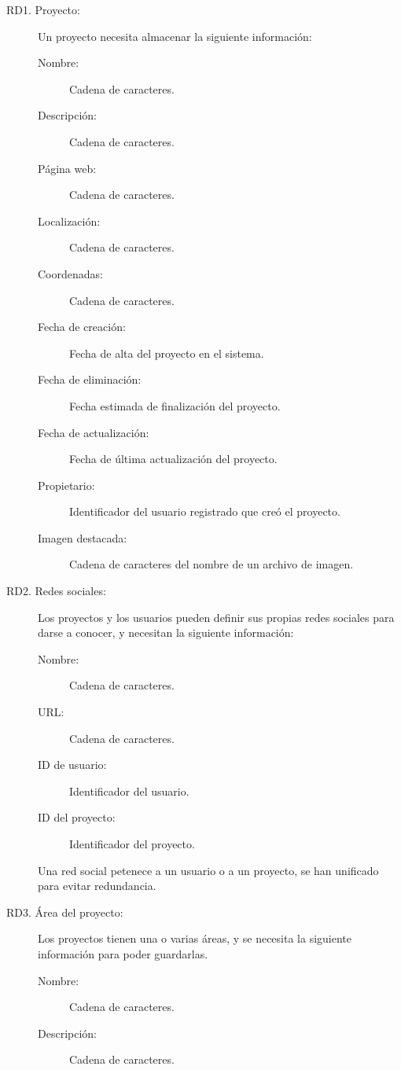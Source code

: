 \begin{description}
    \item[RD1. Proyecto:] Un proyecto necesita almacenar la siguiente información:
        \begin{description}
            \item[Nombre:] Cadena de caracteres.
            \item[Descripción:] Cadena de caracteres.
            \item[Página web:] Cadena de caracteres.
            \item[Localización:] Cadena de caracteres.
            \item[Coordenadas:] Cadena de caracteres.
            \item[Fecha de creación:] Fecha de alta del proyecto en el sistema.
            \item[Fecha de eliminación:] Fecha estimada de finalización del proyecto.
            \item[Fecha de actualización:] Fecha de última actualización del proyecto.
            \item[Propietario:] Identificador del usuario registrado que creó el proyecto.
            \item[Imagen destacada:] Cadena de caracteres del nombre de un archivo de imagen.
        \end{description}
    \item[RD2. Redes sociales:] Los proyectos y los usuarios pueden definir sus propias redes sociales para darse a conocer, y necesitan la siguiente información:
        \begin{description}
            \item[Nombre:] Cadena de caracteres.
            \item[URL:] Cadena de caracteres.
            \item[ID de usuario:] Identificador del usuario.
            \item[ID del proyecto:] Identificador del proyecto.
        \end{description}
        Una red social petenece a un usuario o a un proyecto, se han unificado para evitar redundancia.
    \item[RD3. Área del proyecto:] Los proyectos tienen una o varias áreas, y se necesita la siguiente información para poder guardarlas.
        \begin{description}
            \item[Nombre:] Cadena de caracteres.
            \item[Descripción:] Cadena de caracteres.

\end{description}
\end{description}
